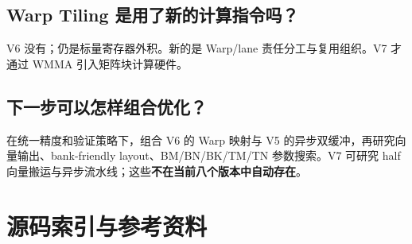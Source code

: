 \documentclass[UTF8,11pt,a4paper,fontset=fandol]{ctexart}
\newcommand{\pagebreakhere}{\clearpage}
\begin{document}
\subsection*{Warp Tiling 是用了新的计算指令吗？}
V6 没有；仍是标量寄存器外积。新的是 Warp/lane 责任分工与复用组织。V7 才通过 WMMA 引入矩阵块计算硬件。

\subsection*{下一步可以怎样组合优化？}
在统一精度和验证策略下，组合 V6 的 Warp 映射与 V5 的异步双缓冲，再研究向量输出、bank-friendly layout、BM/BN/BK/TM/TN 参数搜索。V7 可研究 half 向量搬运与异步流水线；这些\textbf{不在当前八个版本中自动存在}。
\pagebreakhere

\section{源码索引与参考资料}
\end{document}
